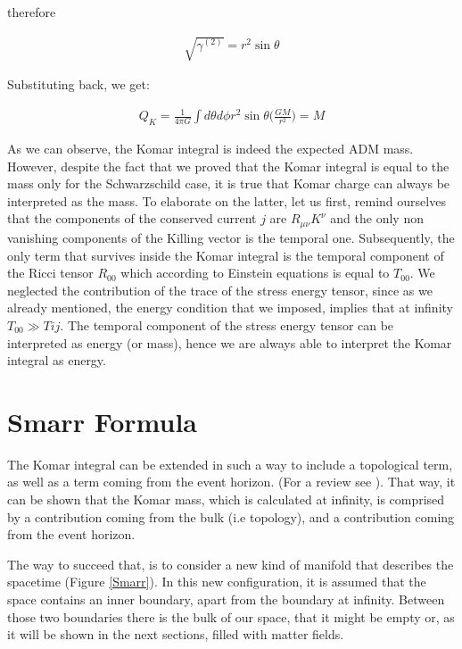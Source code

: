 \documentclass[a4paper,notitlepage]{report}
\begin{document}
\vspace{0.5 em}
therefore

\begin{align}
\sqrt{\gamma^{(2)}} = r^2 \sin\theta
\end{align}

\vspace{0.5em}
Substituting back, we get:

\begin{align}
Q_K = \frac{1}{4\pi G} \int d\theta d\phi r^2 \sin\theta \Big( \frac{GM}{r^2} \Big) = M
\end{align}

\vspace{0.5 em}
As we can observe, the Komar integral is indeed the expected ADM mass. However, despite the fact that we proved that the Komar integral is equal to the mass only for the Schwarzschild case, it is true that Komar charge can always be interpreted as the mass. To elaborate on the latter, let us first, remind ourselves that the components of the conserved current $j$ are $R_{\mu\nu} K^\nu$ and the only non vanishing components of the Killing vector is the temporal one. Subsequently,  the only term that survives inside the Komar integral is the temporal component of the Ricci tensor $R_{00}$ which according to Einstein equations is equal to $T_{00}$. We neglected the contribution of the trace of the stress energy tensor, since as we already mentioned, the energy condition that we imposed, implies that at infinity $T_{00} \gg T{ij}$. The temporal component of the stress energy tensor can be interpreted as energy (or mass), hence we are always able to interpret the Komar integral as energy.


\section{Smarr Formula}

The Komar integral can be extended in such a way to include a topological term, as well as a term coming from the event horizon. (For a review see \cite{kodama2011lecture}). That way, it can be shown that the Komar mass, which is calculated at infinity, is comprised by a contribution coming from the bulk (i.e topology), and a contribution coming from the event horizon. 

The way to succeed that, is to consider a new kind of manifold that describes the spacetime (Figure \ref{Smarr}). In this new configuration, it is assumed that the space contains an inner boundary, apart from the boundary at infinity. Between those two boundaries there is the bulk of our space, that it might be empty or, as it will be shown in the next sections, filled with matter fields.
\end{document}
